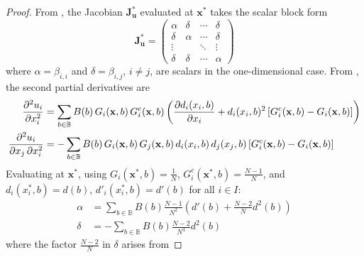 \documentclass{article}
\begin{document}
                \begin{proof}
                    From , the Jacobian $\mathbf{J}_{\mathbf{u}}^*$ evaluated at $\mathbf{x}^*$ takes the scalar block form
                    \begin{equation}
                        \mathbf{J}_{\mathbf{u}}^* = \begin{pmatrix}
                            \alpha & \delta & \cdots & \delta \\
                            \delta & \alpha & \cdots & \delta \\
                            \vdots & & \ddots & \vdots \\
                            \delta & \delta & \cdots & \alpha
                        \end{pmatrix}
                    \end{equation}
                    where $\alpha = \beta_{i,i}$ and $\delta = \beta_{i,j}$, $i \neq j$, are scalars in the one-dimensional case. From 
                    , the second partial derivatives are
                    \begin{align}
                        \pdv[2]{u_i}{x_i} &= \sum_{b\in\mathbb{B}} B(b)\, G_i(\mathbf{x},b)\, 
                        G_i^c(\mathbf{x},b)\left(\pdv{d_i(x_i,b)}{x_i} + d_i(x_i,b)^2
                        \left[G_i^c(\mathbf{x},b) - G_i(\mathbf{x},b)\right]\right) \\
                        \pdv[2]{u_i}{x_j\,\partial x_i} &= -\sum_{b\in\mathbb{B}} B(b)\, 
                        G_i(\mathbf{x},b)\, G_j(\mathbf{x},b)\, d_i(x_i,b)\, d_j(x_j,b)
                        \left[G_i^c(\mathbf{x},b) - G_i(\mathbf{x},b)\right]
                    \end{align}
                    Evaluating at $\mathbf{x}^*$, using $G_i(\mathbf{x}^*,b) = \frac{1}{N}$, 
                    $G_i^c(\mathbf{x}^*,b) = \frac{N-1}{N}$, and $d_i(x_i^*,b) = d(b)$, 
                    $d'_i(x_i^*,b) = d'(b)$ for all $i \in I$:
                    \begin{align}
                        \alpha &= \sum_{b\in\mathbb{B}} B(b)\frac{N-1}{N^2}
                        \left(d'(b) + \frac{N-2}{N}d^2(b)\right) \\
                        \delta &= -\sum_{b\in\mathbb{B}} B(b)\frac{N-2}{N^3} d^2(b)
                    \end{align}
                    where the factor $\frac{N-2}{N}$ in $\delta$ arises from

\end{proof}
\end{document}
